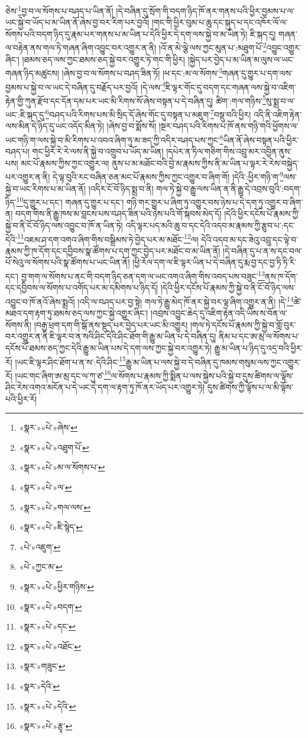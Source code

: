 ཅེས་\footnote{«སྣར་»«པེ་»ཞེས་}བྱ་བ་ལ་སོགས་པ་བཤད་པ་ཡིན་ནོ། །དེ་བཞིན་དུ་སྲོག་གི་བདག་ཉིད་ཁོ་ནར་གནས་པའི་ཕྱིར་བྱམས་པ་ལ་ཡང་སྐྱེ་བ་ཡོད་པ་མ་ཡིན་ནོ་ཞེས་བྱ་བར་རིག་པར་བྱའོ། །གང་གི་ཕྱིར་བུམ་པ་ཆུ་དང་སྐུད་པ་དང་འཁོར་ལོ་ལ་སོགས་པའི་བདག་ཉིད་དུ་རྣམ་པར་གནས་པ་མ་ཡིན་པ་དེའི་ཕྱིར་དེ་དག་ལས་སྐྱེ་བ་མ་ཡིན་ཏེ། ཇི་སྐད་དུ། གཞན་ལ་བརྟེན་ནས་གལ་ཏེ་གཞན་ཞིག་འབྱུང་བར་འགྱུར་ན་ནི། །འོ་ན་མེ་ལྕེ་ལས་ཀྱང་མུན་པ་:མཐུག་པོ་\footnote{«སྣར་»«པེ་»འཐུག་པོ་}འབྱུང་འགྱུར་ཞིང་། །ཐམས་ཅད་ལས་ཀྱང་ཐམས་ཅད་སྐྱེ་བར་འགྱུར་ཏེ་གང་གི་ཕྱིར། །སྐྱེད་པར་བྱེད་པ་མ་ཡིན་མ་ལུས་ལ་ཡང་གཞན་ཉིད་མཚུངས། །ཞེས་བྱ་བ་ལ་སོགས་པ་བཤད་ཟིན་ཏོ། །ཕ་དང་:མ་ལ་སོགས་\footnote{«སྣར་»«པེ་»མ་ལ་སོགས་པ་}གཞན་དུ་གྱུར་པ་དག་ལས་བྱམས་པ་སྐྱེ་བ་ལ་ཡང་དེ་བཞིན་དུ་བརྗོད་པར་བྱའོ། །དེ་ལས་\footnote{«སྣར་»«པེ་»ལ་}ཇི་ལྟར་གོང་དུ་བདག་དང་གཞན་ལས་སྐྱེ་བ་འཇིག་རྟེན་གྱི་ཀུན་རྫོབ་དང་དོན་དམ་པར་ཡང་མི་རིགས་སོ་ཞེས་བསྟན་པ་དེ་བཞིན་དུ། ཚིག་:གལ་གཉིས་\footnote{«སྣར་»«པེ་»གལ་ལས་}སུ་སྨྲ་བ་ལ་ཡང་:ཇི་སྐད་དུ་\footnote{«སྣར་»«པེ་»ཇི་སྙེད་}བཤད་པའི་རིགས་པས་མི་སྲིད་དོ་ཞེས་གོང་དུ་བསྟན་པ་མཇུག་\footnote{«པེ་»འཇུག་}བསྡུ་བའི་ཕྱིར། འདི་ནི་འཇིག་རྟེན་ལས་མིན་དེ་ཉིད་དུ་ཡང་འདོད་མིན་ཏེ། །ཞེས་བྱ་བ་སྨོས་སོ། །སྔར་བཤད་པའི་རིགས་པ་ཁོ་ནས་གཉི་གའི་ཕྱོགས་ལ་ཡང་གཉི་ག་ལས་སྐྱེ་བ་མི་རིགས་པ་འབའ་ཞིག་ཏུ་མ་ཟད་ཀྱི་འདིར་བཤད་པས་ཀྱང་\footnote{«པེ་»ཀྱང་མ་}ཡིན་ནོ་ཞེས་བསྟན་པའི་ཕྱིར་བཤད་པ། གང་ཕྱིར་རེ་རེ་ལས་ནི་སྐྱེ་བ་འགྲུབ་པ་ཡོད་མ་ཡིན། །དཔེར་ན་ཏིལ་གཅིག་གིས་འབྲུ་མར་འབྱིན་ནུས་པས། མང་པོ་རྣམས་ཀྱིས་ཀྱང་འགྱུར་ལ། ནུས་པ་མ་མཐོང་བའི་བྱེ་མ་རྣམས་ཀྱིས་ནི་མ་ཡིན་པ་ལྟར་རེ་རེས་བསྐྱེད་པར་འགྱུར་ན་ནི། དེ་ལྟ་བུའི་རང་བཞིན་ཅན་མང་པོ་རྣམས་ཀྱིས་ཀྱང་འགྱུར་བ་ཞིག་གོ། །དེའི་:ཕྱིར་གཉི་ག་\footnote{«སྣར་»«པེ་»ཕྱིར་གཉིས་}ལས་སྐྱེ་བ་ཡང་རིགས་པ་མ་ཡིན་ནོ། །འདིར་ངོ་བོ་ཉིད་སྨྲ་བ་ནི། གལ་ཏེ་སྐྱེ་བ་རྒྱུ་ལས་ཡིན་ན་ནི་རྒྱུ་དེ་འབྲས་བུའི་:བདག་ཉིད་\footnote{«སྣར་»«པེ་»བདག་}དུ་གྱུར་པ་དང་། གཞན་དུ་གྱུར་པ་དང་། གཉི་གར་གྱུར་པ་ཞིག་ཏུ་འགྱུར་བས་ཉེས་པ་དེ་དག་ཏུ་འགྱུར་བ་ཞིག་ན། བདག་གིས་ནི་རྒྱུ་ཁས་མ་བླངས་པས་བཤད་ཟིན་པའི་ཉེས་པའི་གོ་སྐབས་མེད་དོ། །དེའི་ཕྱིར་དངོས་པོ་རྣམས་ཀྱི་སྐྱེ་བ་ནི་ངོ་བོ་ཉིད་ལས་འབྱུང་བ་ཁོ་ན་ཡིན་ཏེ། འདི་ལྟར་པད་མའི་ཆུ་བ་དང་དེའི་འདབ་མ་རྣམས་ཀྱི་རྩུབ་པ་:དང་དེའི་\footnote{«སྣར་»«པེ་»དང་}འཇམ་ཤ་དག་འགའ་ཞིག་གིས་བསྒྲིམས་ཏེ་བྱེད་པར་མ་མཐོང་\footnote{«སྣར་»«པེ་»འཐོང་}ལ། དེའི་འདབ་མ་དང་ཟེའུ་འབྲུ་དང་ལྟེ་བ་རྣམས་ཀྱི་ཁ་དོག་དང་དབྱིབས་སྣ་ཚོགས་པ་དག་ཀྱང་བྱེད་པར་མཐོང་བ་མ་ཡིན་ནོ། །དེ་བཞིན་དུ་པ་ན་ས་དང་བལ་པོ་སེའུ་ལ་སོགས་པའི་སྣ་ཚོགས་པ་ཡང་ཡིན་ནོ། །ཕྱི་རོལ་དག་ལ་ཇི་ལྟར་ཡིན་པ་དེ་བཞིན་དུ་རྨ་བྱ་དང་བྱ་ཏི་ཏི་རི་དང་། བྱ་གག་ལ་སོགས་པ་ནང་གི་བདག་ཉིད་ཅན་དག་ལ་ཡང་འགའ་ཞིག་གིས་འབད་པས་བཟུང་\footnote{«སྣར་»གཟུང་}ནས་ཁ་དོག་དང་དབྱིབས་ལ་སོགས་པ་འགོད་པར་མ་དམིགས་པ་ཉིད་དོ། །དེའི་ཕྱིར་དངོས་པོ་རྣམས་ཀྱི་སྐྱེ་བ་ནི་ངོ་བོ་ཉིད་ལས་འབྱུང་བ་ཁོ་ནའོ་ཞེས་སྨྲའོ། །འདི་ལ་བཤད་པར་བྱ་སྟེ། གལ་ཏེ་རྒྱུ་མེད་ཁོ་ནར་སྐྱེ་བར་ལྟ་ཞིག་འགྱུར་ན་ནི། །དེ་\footnote{«སྣར་»དེའི་}ཚེ་མཐའ་དག་རྟག་ཏུ་ཐམས་ཅད་ལས་ཀྱང་སྐྱེ་འགྱུར་ཞིང་། །འབྲས་འབྱུང་ཆེད་དུ་འཇིག་རྟེན་འདི་ཡིས་ས་བོན་ལ་སོགས་ནི། །བརྒྱ་ཕྲག་དག་གི་སྒོ་ནས་སྡུད་པར་བྱེད་པར་ཡང་མི་འགྱུར། །གལ་ཏེ་དངོས་པོ་རྣམས་ཀྱི་སྐྱེ་བ་གློ་བུར་བར་འགྱུར་ན་ནི་ཇི་ལྟར་བ་ན་སའི་ཤིང་དེའི་ཤིང་ཐོག་གི་རྒྱུ་མ་ཡིན་པ་དེ་བཞིན་དུ། ནིམ་པ་དང་ཨ་མྲ་ལ་སོགས་པ་དངོས་པོ་ཐམས་ཅད་ཀྱང་དེའི་རྒྱུ་མ་ཡིན་པས་དེ་དག་ལས་ཀྱང་སྐྱེ་བར་འགྱུར་ཏེ། རྒྱུ་མ་ཡིན་པ་ཉིད་དུ་འདྲ་བའི་ཕྱིར་རོ། །ཡང་ཇི་ལྟར་ཤིང་ཐོག་པ་ན་ས་:དེའི་ཤིང་\footnote{«སྣར་»«པེ་»དེའི་}རྒྱུ་མ་ཡིན་པ་ལས་སྐྱེ་བ་དེ་བཞིན་དུ་ཁམས་གསུམ་ལས་ཀྱང་འགྱུར་རོ། །ཡང་གང་ཞིག་ཨ་མྲ་དང་ལ་ཀུ་ཙ་\footnote{«སྣར་»«པེ་»རྩྭ་}ལ་སོགས་པ་རྣམས་ཀྱི་སྨིན་པ་ལས་སྐྱེས་པའི་སྐྱེ་བ་དུས་ཚིགས་ལ་ལྟོས་ཤིང་རེས་འགའ་མངོན་པ་དེ་ཡང་དེ་དག་ལ་རྟག་ཏུ་ཁོ་ནར་ཡོད་པར་འགྱུར་ཏེ། དུས་ཚིགས་ཀྱི་ལྟོས་པ་ལ་མི་ལྟོས་པའི་ཕྱིར་རོ། 